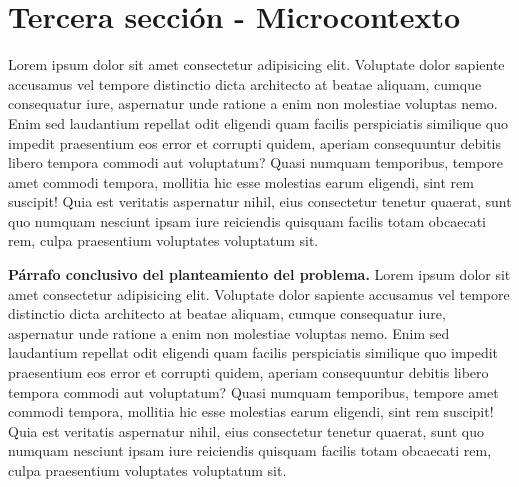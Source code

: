 \section{Tercera sección - Microcontexto}
    \begin{sectext}
    Lorem ipsum dolor sit amet consectetur adipisicing elit. Voluptate dolor sapiente accusamus vel tempore distinctio dicta architecto at beatae aliquam, cumque consequatur iure, aspernatur unde ratione a enim non molestiae voluptas nemo. Enim sed laudantium repellat odit eligendi quam facilis perspiciatis similique quo impedit praesentium eos error et corrupti quidem, aperiam consequuntur debitis libero tempora commodi aut voluptatum? Quasi numquam temporibus, tempore amet commodi tempora, mollitia hic esse molestias earum eligendi, sint rem suscipit! Quia est veritatis aspernatur nihil, eius consectetur tenetur quaerat, sunt quo numquam nesciunt ipsam iure reiciendis quisquam facilis totam obcaecati rem, culpa praesentium voluptates voluptatum sit.
    \newline

    \end{sectext}


\textbf{Párrafo conclusivo del planteamiento del problema.} Lorem ipsum dolor sit amet consectetur adipisicing elit. Voluptate dolor sapiente accusamus vel tempore distinctio dicta architecto at beatae aliquam, cumque consequatur iure, aspernatur unde ratione a enim non molestiae voluptas nemo. Enim sed laudantium repellat odit eligendi quam facilis perspiciatis similique quo impedit praesentium eos error et corrupti quidem, aperiam consequuntur debitis libero tempora commodi aut voluptatum? Quasi numquam temporibus, tempore amet commodi tempora, mollitia hic esse molestias earum eligendi, sint rem suscipit! Quia est veritatis aspernatur nihil, eius consectetur tenetur quaerat, sunt quo numquam nesciunt ipsam iure reiciendis quisquam facilis totam obcaecati rem, culpa praesentium voluptates voluptatum sit.

